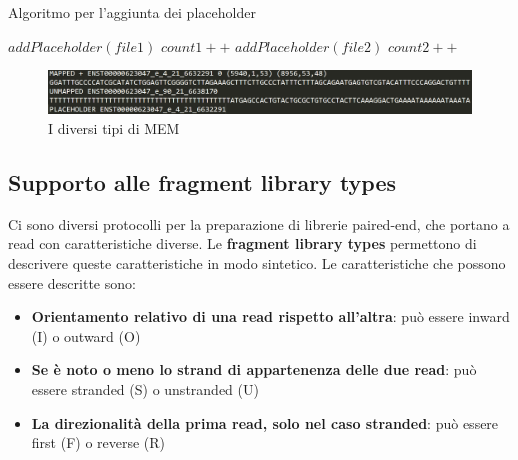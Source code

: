 \newpage

\begin{algorithm}
\caption{Algoritmo per l'aggiunta dei placeholder}\label{placeholder}
\begin{algorithmic}[1]
			\State $addPlaceholder(file1)$
			\State $count1++$
		\Else
			\State $addPlaceholder(file2)$
			\State $count2++$
		\EndIf
	\EndWhile
\EndProcedure
\end{algorithmic}
\end{algorithm}

\begin{figure}
	\centering
	\includegraphics[width=\linewidth]{images/tipiMEM2.png}
  \caption{I diversi tipi di MEM}
  \label{fig:MEMTypes}
\end{figure}

\newpage

\subsection{Supporto alle fragment library types}
Ci sono diversi protocolli per la preparazione di librerie paired-end, che portano a read con caratteristiche diverse. Le \textbf{fragment library types} permettono di descrivere queste caratteristiche in modo sintetico. Le caratteristiche che possono essere descritte sono:
\begin{itemize}
	\item \textbf{Orientamento relativo di una read rispetto all'altra}: può essere inward (I) o outward (O)
	\item \textbf{Se è noto o meno lo strand di appartenenza delle due read}:  può essere stranded (S) o unstranded (U)
	\item \textbf{La direzionalità della prima read, solo nel caso stranded}: può essere first (F) o reverse (R)
\end{itemize}

